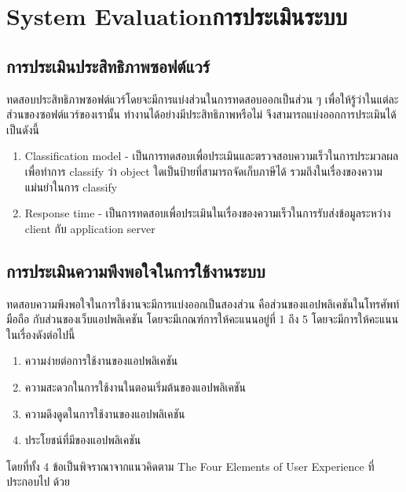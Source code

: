 
\chapter{\ifenglish System Evaluation\else การประเมินระบบ\fi}

\ifenglish
\else
\section{การประเมินประสิทธิภาพซอฟต์แวร์}
ทดสอบประสิทธิภาพซอฟต์แวร์โดยจะมีการแบ่งส่วนในการทดสอบออกเป็นส่วน ๆ เพื่อให้รู้ว่าในแต่ละส่วนของซอฟต์แวร์ของเรานั้น 
ทำงานได้อย่างมีประสิทธิภาพหรือไม่ จึงสามารถแบ่งออกการประเมินได้เป็นดังนี้ 
\begin{enumerate}
    \item Classification model - เป็นการทดสอบเพื่อประเมินและตรวจสอบความเร็วในการประมวลผลเพื่อทำการ classify 
    ว่า object ใดเป็นป้ายที่สามารถจัดเก็บภาษีได้ รวมถึงในเรื่องของความแม่นยำในการ classify  
    \item Response time - เป็นการทดสอบเพื่อประเมินในเรื่องของความเร็วในการรับส่งข้อมูลระหว่าง client กับ application server  
\end{enumerate}

\section{การประเมินความพึงพอใจในการใช้งานระบบ}
ทดสอบความพึงพอใจในการใช้งานจะมีการแบ่งออกเป็นสองส่วน คือส่วนของแอปพลิเคชันในโทรศัพท์มือถือ กับส่วนของเว็บแอปพลิเคชัน 
โดยจะมีเกณฑ์การให้คะแนนอยู่ที่ 1 ถึง 5 โดยจะมีการให้คะแนนในเรื่องดังต่อไปนี้ 
\begin{enumerate}
    \item ความง่ายต่อการใช้งานของแอปพลิเคชัน 
    \item ความสะดวกในการใช้งานในตอนเริ่มต้นของแอปพลิเคชัน 
    \item ความดึงดูดในการใช้งานของแอปพลิเคชัน        
    \item ประโยชน์ที่มีของแอปพลิเคชัน 
\end{enumerate}

โดยที่ทั้ง 4 ข้อเป็นพิจราณาจากแนวคิดตาม The Four Elements of User Experience \cite{uxquantification} ที่ประกอบไป ด้วย 


